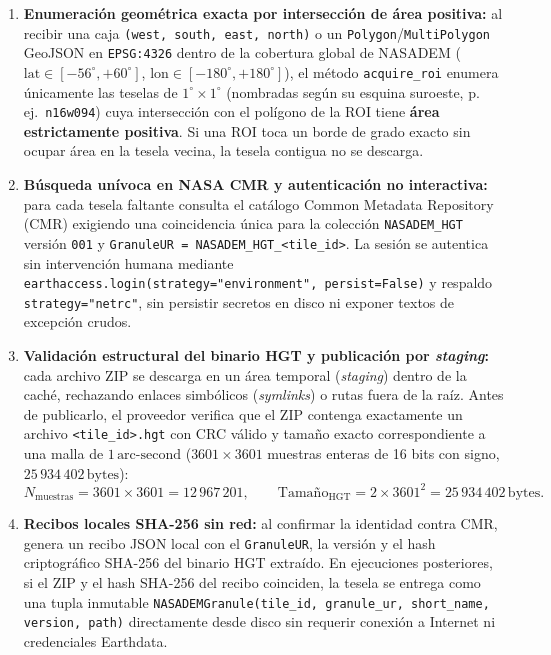 \documentclass[11pt,a4paper]{article}
\newcommand{\unit}[1]{\mathrm{#1}}
\begin{document}
\begin{enumerate}
  \item \textbf{Enumeración geométrica exacta por intersección de área positiva:} al recibir una caja
        \texttt{(west, south, east, north)} o un \texttt{Polygon}/\texttt{MultiPolygon} GeoJSON en
        \texttt{EPSG:4326} dentro de la cobertura global de NASADEM ($\text{lat} \in [-56^\circ, +60^\circ]$,
        $\text{lon} \in [-180^\circ, +180^\circ]$), el método \texttt{acquire\_roi} enumera únicamente las
        teselas de $1^\circ \times 1^\circ$ (nombradas según su esquina suroeste, p.\,ej.\ \texttt{n16w094}) cuya
        intersección con el polígono de la ROI tiene \textbf{área estrictamente positiva}. Si una ROI toca un
        borde de grado exacto sin ocupar área en la tesela vecina, la tesela contigua no se descarga.
  \item \textbf{Búsqueda unívoca en NASA CMR y autenticación no interactiva:} para cada tesela faltante consulta
        el catálogo Common Metadata Repository (CMR) exigiendo una coincidencia única para la colección
        \texttt{NASADEM\_HGT} versión \texttt{001} y \texttt{GranuleUR = NASADEM\_HGT\_<tile\_id>}. La sesión se
        autentica sin intervención humana mediante \texttt{earthaccess.login(strategy="environment", persist=False)}
        y respaldo \texttt{strategy="netrc"}, sin persistir secretos en disco ni exponer textos de excepción crudos.
  \item \textbf{Validación estructural del binario HGT y publicación por \emph{staging}:} cada archivo ZIP se
        descarga en un área temporal (\emph{staging}) dentro de la caché, rechazando enlaces simbólicos
        (\emph{symlinks}) o rutas fuera de la raíz. Antes de publicarlo, el proveedor verifica que el ZIP
        contenga exactamente un archivo \texttt{<tile\_id>.hgt} con CRC válido y tamaño exacto correspondiente
        a una malla de $1\,\text{arc-second}$ ($3601 \times 3601$ muestras enteras de 16 bits con signo,
        $25\,934\,402\,\text{bytes}$):
        \begin{equation}
          N_{\text{muestras}} = 3601 \times 3601 = 12\,967\,201, \qquad
          \text{Tamaño}_{\mathrm{HGT}} = 2 \times 3601^2 = 25\,934\,402\,\unit{bytes}.
          \label{eq:nasadem-hgt-size}
        \end{equation}
  \item \textbf{Recibos locales SHA-256 sin red:} al confirmar la identidad contra CMR, genera un recibo JSON
        local con el \texttt{GranuleUR}, la versión y el hash criptográfico SHA-256 del binario HGT extraído. En
        ejecuciones posteriores, si el ZIP y el hash SHA-256 del recibo coinciden, la tesela se entrega como una
        tupla inmutable \texttt{NASADEMGranule(tile\_id, granule\_ur, short\_name, version, path)} directamente
        desde disco sin requerir conexión a Internet ni credenciales Earthdata.
\end{enumerate}
\end{document}
